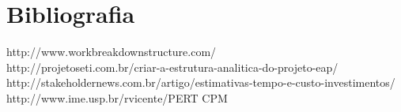 \documentclass[12pt,a4paper,final]{article}
\begin{document}
\begin{figure}
\end{figure}
\newpage
\section{Bibliografia}
http://www.workbreakdownstructure.com/\\
http://projetoseti.com.br/criar-a-estrutura-analitica-do-projeto-eap/\\
http://stakeholdernews.com.br/artigo/estimativas-tempo-e-custo-investimentos/\\
http://www.ime.usp.br/rvicente/PERT CPM
\end{document}
